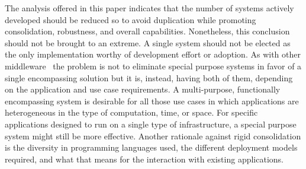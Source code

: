 \documentclass{sig-alternate}
\begin{document}
The analysis offered in this paper indicates that the number of \pilot systems
actively developed should be reduced so to avoid duplication while promoting
consolidation, robustness, and overall capabilities. Nonetheless, this
conclusion should not be brought to an extreme. A single \pilot system should
not be elected as the only implementation worthy of development effort or
adoption. As with other middleware~\cite{bernstein1996} the problem is not to
eliminate special purpose systems in favor of a single encompassing solution but
it is, instead, having both of them, depending on the application and use case
requirements. A multi-purpose, functionally encompassing \pilot system is
desirable for all those use cases in which applications are heterogeneous in the
type of computation, time, or space. For specific applications designed to run
on a single type of infrastructure, a special purpose system might still be more
effective.
Another rationale against rigid consolidation is the diversity in programming
languages used, the different deployment models required, and what that means
for the interaction with existing applications.


\end{document}
